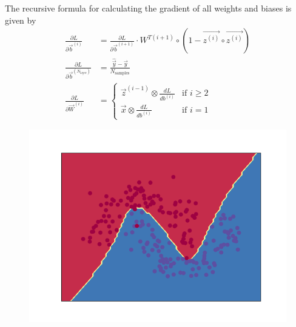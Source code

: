 \documentclass[oneside]{memoir}
\begin{document}
The recursive formula for calculating the gradient of all weights and biases is given by
\begin{align}
  \label{dLdb_i}
  \frac{\partial L}{\partial \vec{b}^{(i)}} &= \frac{\partial L}{\partial \vec{b}^{(i+1)}} \cdot{W}^{T(i+1)} \circ (1-\vec{z^{(i)}}\circ \vec{z^{(i)}})\\
  \frac{\partial L}{\partial \vec{b}^{(N_\text{layer})}} &= \frac{\hat{\vec{y}}-\vec{y} }{N_{\text{samples}}}\\
  \label{dLdW_i}
  \frac{\partial L}{\partial \vec{W}^{(i)}} &=
                                              \begin{cases}
                                                \vec{z}^{(i-1)} \otimes \frac{dL}{db^{(i)}} & \text{if } i \geq 2 \\
                                                \vec{x}\otimes \frac{dL}{db^{(i)}}  & \text{if } i = 1
                                              \end{cases}
\end{align}



\begin{figure}
  \centering
  \includegraphics[scale=0.8]{decisionBoundary.png}
\end{figure}
\end{document}
